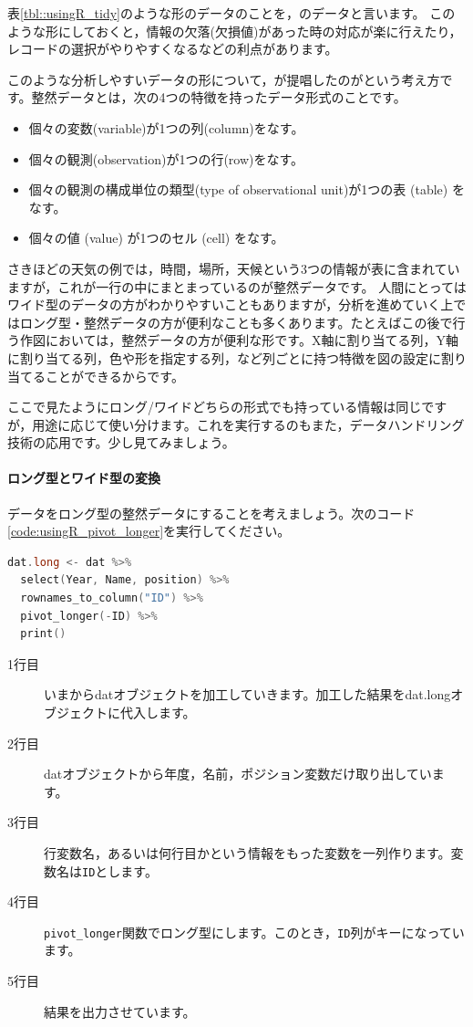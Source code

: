 \documentclass{ltjsbook}
\begin{document}
表\ref{tbl::usingR_tidy}のような形のデータのことを，のデータと言います。
このような形にしておくと，情報の欠落(欠損値)があった時の対応が楽に行えたり，レコードの選択がやりやすくなるなどの利点があります。

このような分析しやすいデータの形について，\textcite{Hadley2014}が提唱したのがという考え方です。整然データとは，次の4つの特徴を持ったデータ形式のことです。
\begin{itemize}
	\item 個々の変数(variable)が1つの列(column)をなす。
	\item 個々の観測(observation)が1つの行(row)をなす。
	\item 個々の観測の構成単位の類型(type of observational unit)が1つの表 (table) をなす。
	\item 個々の値 (value) が1つのセル (cell) をなす。
\end{itemize}
さきほどの天気の例では，時間，場所，天候という3つの情報が表に含まれていますが，これが一行の中にまとまっているのが整然データです。
人間にとってはワイド型のデータの方がわかりやすいこともありますが，分析を進めていく上ではロング型・整然データの方が便利なことも多くあります。たとえばこの後で行う作図においては，整然データの方が便利な形です。X軸に割り当てる列，Y軸に割り当てる列，色や形を指定する列，など列ごとに持つ特徴を図の設定に割り当てることができるからです。

ここで見たようにロング/ワイドどちらの形式でも持っている情報は同じですが，用途に応じて使い分けます。これを実行するのもまた，データハンドリング技術の応用です。少し見てみましょう。

\paragraph{ロング型とワイド型の変換}
データをロング型の整然データにすることを考えましょう。次のコード\ref{code:usingR_pivot_longer}を実行してください。
\begin{lstlisting}[language=c++,label={code:usingR_pivot_longer},caption={ロング型にする関数}]
dat.long <- dat %>%
  select(Year, Name, position) %>%
  rownames_to_column("ID") %>%
  pivot_longer(-ID) %>%
  print() 
\end{lstlisting}

\begin{description}
	\item[1行目] いまからdatオブジェクトを加工していきます。加工した結果をdat.longオブジェクトに代入します。
	\item[2行目] datオブジェクトから年度，名前，ポジション変数だけ取り出しています。
	\item[3行目] 行変数名，あるいは何行目かという情報をもった変数を一列作ります。変数名は\verb|ID|とします。
	\item[4行目] \verb|pivot_longer|関数でロング型にします。このとき，\verb|ID|列がキーになっています。
	\item[5行目] 結果を出力させています。
\end{description}
\end{document}
